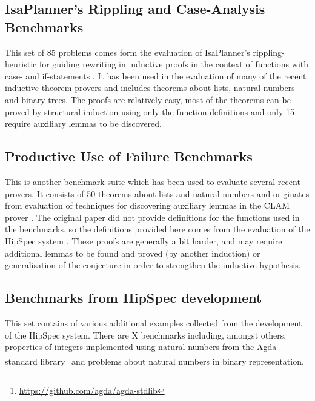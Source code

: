 \documentclass{llncs}
\begin{document}
\subsection{IsaPlanner's Rippling and Case-Analysis Benchmarks}
\label{sec:isap}
This set of 85 problems comes form the evaluation of IsaPlanner's rippling-heuristic for guiding rewriting in inductive proofs in the context of functions with case- and if-statements \cite{IsaPcase}. It has been used in the evaluation of many of the recent inductive theorem provers and includes theorems about lists, natural numbers and binary trees. The proofs are relatively easy, most of the theorems can be proved by structural induction using only the function definitions and only 15 require auxiliary lemmas to be discovered.

\subsection{Productive Use of Failure Benchmarks}
This is another benchmark suite which has been used to evaluate several recent provers. It consists of 50 theorems about lists and natural numbers and originates from evaluation of techniques for discovering auxiliary lemmas in the CLAM prover \cite{productiveuse}. The original paper did not provide definitions for the functions used in the benchmarks, so the definitions provided here comes from the evaluation of the HipSpec system \cite{hipspecCADE}. These proofs are generally a bit harder, and may require additional lemmas to be found and proved (by another induction) or generalisation of the conjecture in order to strengthen the inductive hypothesis. 

\subsection{Benchmarks from HipSpec development}
This set contains of various additional examples collected from the development of the HipSpec system. There are X benchmarks including, amongst others, properties of integers implemented using natural numbers from the Agda standard library\footnote{\url{https://github.com/agda/agda-stdlib}} and problems about natural numbers in binary representation. 

\end{document}
